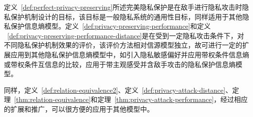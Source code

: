 定义~\ref{def:perfect-privacy-preserving}所述完美隐私保护是在敌手进行隐私攻击时隐私保护机制设计的目标，该目标是一般隐私系统的通用性目标，同样适用于其他隐私保护信息熵模型。定义~\ref{def:privacy-preserving-performance}和定义	~\ref{def:privacy-preserving-performance-distance}是在受到一定隐私攻击条件下，对不同隐私保护机制效果的评价，该评价方法相对信源模型独立，故可进行一定的扩展应用到其他隐私保护信息熵模型中，如引入隐私敏感偏好并应用带权条件信息熵或带权条件互信息的比较，应用于带主观感受并含敌手攻击的隐私保护信息熵模型。

同样，定义~\ref{def:relation-equivalence2}、定义~\ref{def:privacy-attack-distance}、定理~\ref{thm:relation-equivalence}和定理~\ref{thm:privacy-attack-performance}，经过相应的扩展和推广，可以很方便的应用于其他模型中。

%
%
%

